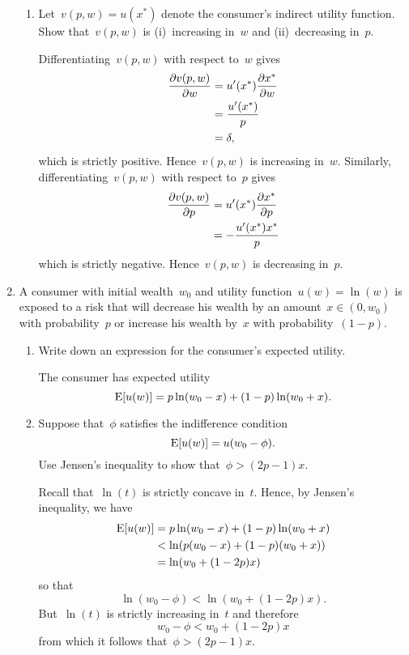 \begin{enumerate}
\begin{enumerate}
		\item
		Let~$v(p,w)=u(x^*)$ denote the consumer's indirect utility function.
		Show that~$v(p,w)$ is (i)~increasing in~$w$ and (ii)~decreasing in~$p$.
		\begin{solution}
			Differentiating~$v(p,w)$ with respect to~$w$ gives
			\begin{align}
				\frac{\partial v(p,w)}{\partial w}
				&= u'(x^*)\frac{\partial x^*}{\partial w}\\
				&= \frac{u'(x^*)}{p}\\
				&= \delta,
			\end{align}
			which is strictly positive.
			Hence~$v(p,w)$ is increasing in~$w$.
			Similarly, differentiating~$v(p,w)$ with respect to~$p$ gives
			\begin{align}
				\frac{\partial v(p,w)}{\partial p}
				&= u'(x^*)\frac{\partial x^*}{\partial p}\\
				&= -\frac{u'(x^*)x^*}{p}
			\end{align}
			which is strictly negative.
			Hence~$v(p,w)$ is decreasing in~$p$.
		\end{solution}

	\end{enumerate}

	\item
	A consumer with initial wealth~$w_0$ and utility function~$u(w)=\ln(w)$ is exposed to a risk that will decrease his wealth by an amount~$x\in(0,w_0)$ with probability~$p$ or increase his wealth by~$x$ with probability~$(1-p)$.
	\begin{enumerate}

		\item
		Write down an expression for the consumer's expected utility.
		\begin{solution}
			The consumer has expected utility
			\[ \operatorname{E}[u(w)]=p\ln(w_0-x)+(1-p)\ln(w_0+x). \]
		\end{solution}

		\item
		Suppose that~$\phi$ satisfies the indifference condition
		\[ \operatorname{E}[u(w)]=u(w_0-\phi). \label{eq:risk_aversion_indiff}\]
		Use Jensen's inequality to show that~$\phi>(2p-1)x$.
		\begin{solution}
			Recall that~$\ln(t)$ is strictly concave in~$t$.
			Hence, by Jensen's inequality, we have
			\begin{align}
				\operatorname{E}[u(w)]
				&= p\ln(w_0-x)+(1-p)\ln(w_0+x)\\
				&< \ln(p(w_0-x)+(1-p)(w_0+x))\\
				&= \ln(w_0+(1-2p)x)
			\end{align}
			so that
			\[ \ln(w_0-\phi)<\ln(w_0+(1-2p)x). \]
			But~$\ln(t)$ is strictly increasing in~$t$ and therefore
			\[ w_0-\phi<w_0+(1-2p)x \]
			from which it follows that~$\phi>(2p-1)x$.
		\end{solution}


\end{enumerate}
\end{enumerate}
